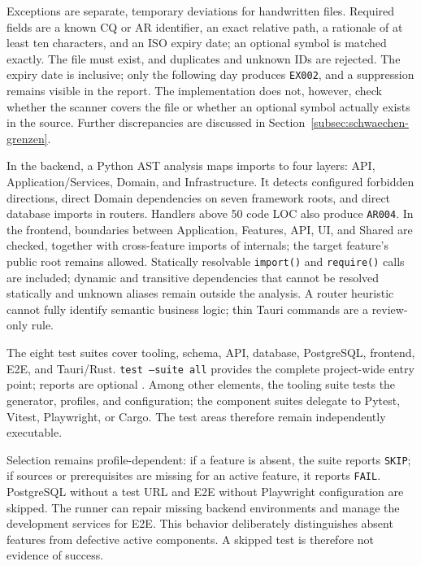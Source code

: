 Exceptions are separate, temporary deviations for handwritten files. Required
fields are a known CQ or AR identifier, an exact relative path, a rationale of
at least ten characters, and an ISO expiry date; an optional symbol is matched
exactly. The file must exist, and duplicates and unknown IDs are rejected. The
expiry date is inclusive; only the following day produces \texttt{EX002}, and
a suppression remains visible in the report. The implementation does not,
however, check whether the scanner covers the file or whether an optional
symbol actually exists in the source. Further discrepancies are discussed in
Section~\ref{subsec:schwaechen-grenzen}.

In the backend, a Python AST analysis maps imports to four layers: API,
Application/Services, Domain, and Infrastructure. It detects configured
forbidden directions, direct Domain dependencies on seven framework roots,
and direct database imports in routers. Handlers above 50 code LOC also
produce \texttt{AR004}. In the frontend, boundaries between Application,
Features, API, UI, and Shared are checked, together with cross-feature imports
of internals; the target feature's public root  remains allowed.
Statically resolvable \texttt{import()} and \texttt{require()} calls are
included; dynamic and transitive dependencies that cannot be resolved
statically and unknown aliases remain outside the analysis. A router heuristic
cannot fully identify semantic business logic; thin Tauri commands are a
review-only rule.

The eight test suites cover tooling, schema, API, database, PostgreSQL,
frontend, E2E, and Tauri/Rust. \texttt{test --suite all} provides the complete
project-wide entry point; reports are optional
\parencite{kleiveist2026control,kleiveist2026tooling}.
Among other elements, the tooling suite tests the generator, profiles, and
configuration; the component suites delegate to Pytest, Vitest, Playwright, or
Cargo. The test areas therefore remain independently executable.

Selection remains profile-dependent: if a feature is absent, the suite reports
\texttt{SKIP}; if sources or prerequisites are missing for an active feature,
it reports \texttt{FAIL}. PostgreSQL without a test URL and E2E without
Playwright configuration are skipped. The runner can repair missing backend
environments and manage the development services for E2E.
This behavior deliberately distinguishes absent features from defective active
components. A skipped test is therefore not evidence of success.

